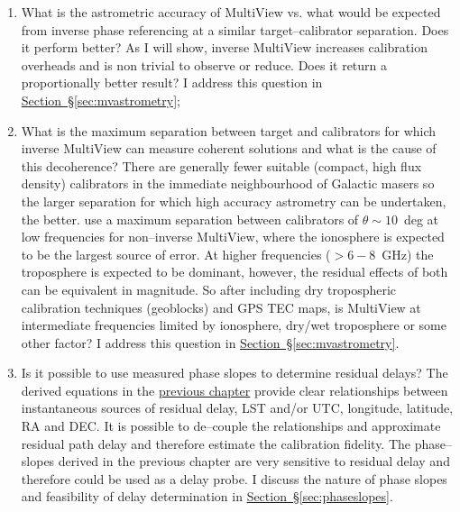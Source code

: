	\begin{enumerate}
		\item What is the astrometric accuracy of MultiView vs. what would be expected from inverse phase referencing at a similar target--calibrator separation. Does it perform better? As I will show, inverse MultiView increases calibration overheads and is non trivial to observe or reduce. Does it return a proportionally better result? I address this question in \hyperref[sec:mvastrometry]{Section~\S\ref*{sec:mvastrometry}};
		\item What is the maximum separation between target and calibrators for which inverse MultiView can measure coherent solutions and what is the cause of this decoherence? There are generally fewer suitable (compact, high flux density) calibrators in the immediate neighbourhood of Galactic masers so the larger separation for which high accuracy astrometry can be undertaken, the better. \citet{Rioja2017} use a maximum separation between calibrators of $\theta\sim10$~deg at low frequencies for non--inverse MultiView, where the ionosphere is expected to be the largest source of error. At higher frequencies ($>6-8$~GHz) the troposphere is expected to be dominant, however, the residual effects of both can be equivalent in magnitude. So after including dry tropospheric calibration techniques (geoblocks) and GPS TEC maps, is MultiView at intermediate frequencies limited by ionosphere, dry/wet troposphere or some other factor? I address this question in \hyperref[sec:mvastrometry]{Section~\S\ref*{sec:mvastrometry}}.
		
		\item Is it possible to use measured phase slopes to determine residual delays? The derived equations in the \hyperref[chap:chapter5]{previous chapter} provide clear relationships between instantaneous sources of residual delay, LST and/or UTC, longitude, latitude, RA and DEC. It is possible to de--couple the relationships and approximate residual path delay and therefore estimate the calibration fidelity. The phase--slopes derived in the previous chapter are very sensitive to residual delay and therefore could be used as a delay probe. I discuss the nature of phase slopes and feasibility of delay determination in \hyperref[sec:phaseslopes]{Section~\S\ref*{sec:phaseslopes}}.	
			

\end{enumerate}
